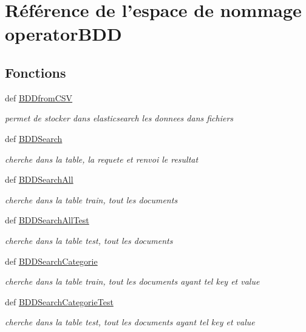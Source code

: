 \hypertarget{namespaceoperatorBDD}{\section{Référence de l'espace de nommage operator\-B\-D\-D}
\label{namespaceoperatorBDD}
}
\subsection*{Fonctions}
\begin{DoxyCompactItemize}
\item 
def \hyperlink{namespaceoperatorBDD_a5aaccf3717ce1479bbd6ef2a0ffcbf49}{B\-D\-Dfrom\-C\-S\-V}
\begin{DoxyCompactList}\small\item\em permet de stocker dans elasticsearch les donnees dans fichiers \end{DoxyCompactList}\item 
def \hyperlink{namespaceoperatorBDD_a9890bc0308c65dae331300c93f804b11}{B\-D\-D\-Search}
\begin{DoxyCompactList}\small\item\em cherche dans la table, la requete et renvoi le resultat \end{DoxyCompactList}\item 
def \hyperlink{namespaceoperatorBDD_a84ebaeadd8b021780f5fa72f73bf3ea3}{B\-D\-D\-Search\-All}
\begin{DoxyCompactList}\small\item\em cherche dans la table train, tout les documents \end{DoxyCompactList}\item 
def \hyperlink{namespaceoperatorBDD_aa9ab222b23d1b7a6e094fb82d702cd0a}{B\-D\-D\-Search\-All\-Test}
\begin{DoxyCompactList}\small\item\em cherche dans la table test, tout les documents \end{DoxyCompactList}\item 
def \hyperlink{namespaceoperatorBDD_a03889cf9d5fd998892c621491a12142b}{B\-D\-D\-Search\-Categorie}
\begin{DoxyCompactList}\small\item\em cherche dans la table train, tout les documents ayant tel key et value \end{DoxyCompactList}\item 
def \hyperlink{namespaceoperatorBDD_a30969a6c243559357c836ae43365877b}{B\-D\-D\-Search\-Categorie\-Test}
\begin{DoxyCompactList}\small\item\em cherche dans la table test, tout les documents ayant tel key et value \end{DoxyCompactList}\end{DoxyCompactItemize}

